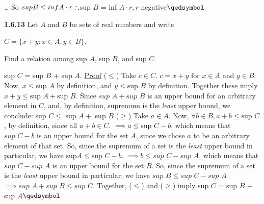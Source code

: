 \documentclass[12pt]{article}
\begin{document}
\begin{solution}
\dots\newline
So $sup B\leq inf A\cdot r\newline
\therefore $sup $B$ = inf $A\cdot r, r$ negative\flushright$\qedsymbol$


\end{solution}

\begin{problem}\textbf{1.6.13}
Let $A$ and $B$ be sets of real numbers and write
\begin{center}
    $C=\{x+y:x\in A,y\in B\}$.
\end{center}
Find a relation among  sup $A$, sup $B$, and sup $C$.

\end{problem}
\begin{solution}
sup $C$ = sup $B$ + sup $A$.\newline
\underline{Proof}\newline
($\leq$) Take $c\in C$.\newline
$c=x+y$ for $x\in A$ and $y\in B$.\newline
Now, $x\leq \text{sup }A$ by definition, and\newline
$y\leq \text{sup }B$ by definition.\newline
Together these imply $x+y\leq \text{sup }A+\text{sup }B$.\newline
Since $\textit{sup }A+\textit{sup }B$ is an upper bound for an arbitrary element in $C$, and, by definition, supremum is the \textit{least} upper bound, we conclude:\newline
sup $C\leq$ sup $A+$ sup $B$\newline
($\geq$) Take $a\in A$.\newline
Now, $\forall b\in B, a+b\leq \text{sup }C$, by definition, since all $a+b\in C$.\newline
$\implies a\leq \text{sup }C-b$, which means that $\textit{sup }C-b$ is an upper bound for the set $A$, since we chose $a$ to be an arbitrary element of that set.\newline
So, since the supremum of a set is the \textit{least} upper bound in particular, we have\newline 
$\text{sup} A\leq\text{sup }C-b$.\newline
$\implies b\leq\textit{sup }C-\textit{sup }A$, which means that $\textit{sup }C-\textit{sup }A$ is an upper bound for the set $B$.\newline
So, since the supremum of a set is the \textit{least} upper bound in particular, we have\newline
$\textit{sup }B\leq\textit{sup }C-\textit{sup }A$\newline
$\implies \textit{sup }A+\textit{sup }B\leq \textit{sup }C$.\newline
Together, ($\leq$) and ($\geq$) imply sup $C$ = sup $B$ + sup $A$\flushright$\qedsymbol$
\end{solution}
\end{document}
